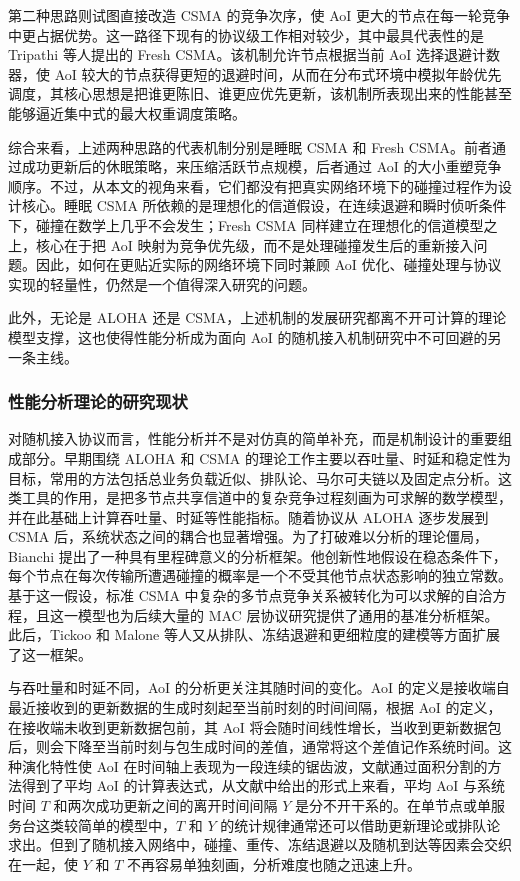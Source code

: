第二种思路则试图直接改造 CSMA 的竞争次序，使 AoI 更大的节点在每一轮竞争中更占据优势。这一路径下现有的协议级工作相对较少，其中最具代表性的是 Tripathi 等人提出的 Fresh CSMA。该机制允许节点根据当前 AoI 选择退避计数器，使 AoI 较大的节点获得更短的退避时间，从而在分布式环境中模拟年龄优先调度，其核心思想是把谁更陈旧、谁更应优先更新，该机制所表现出来的性能甚至能够逼近集中式的最大权重调度策略。

综合来看，上述两种思路的代表机制分别是睡眠 CSMA 和 Fresh CSMA。前者通过成功更新后的休眠策略，来压缩活跃节点规模，后者通过 AoI 的大小重塑竞争顺序。不过，从本文的视角来看，它们都没有把真实网络环境下的碰撞过程作为设计核心。睡眠 CSMA 所依赖的是理想化的信道假设，在连续退避和瞬时侦听条件下，碰撞在数学上几乎不会发生；Fresh CSMA 同样建立在理想化的信道模型之上，核心在于把 AoI 映射为竞争优先级，而不是处理碰撞发生后的重新接入问题。因此，如何在更贴近实际的网络环境下同时兼顾 AoI 优化、碰撞处理与协议实现的轻量性，仍然是一个值得深入研究的问题。

此外，无论是 ALOHA 还是 CSMA，上述机制的发展研究都离不开可计算的理论模型支撑，这也使得性能分析成为面向 AoI 的随机接入机制研究中不可回避的另一条主线。

\subsubsection{性能分析理论的研究现状}

对随机接入协议而言，性能分析并不是对仿真的简单补充，而是机制设计的重要组成部分。早期围绕 ALOHA 和 CSMA 的理论工作主要以吞吐量、时延和稳定性为目标，常用的方法包括总业务负载近似、排队论、马尔可夫链以及固定点分析。这类工具的作用，是把多节点共享信道中的复杂竞争过程刻画为可求解的数学模型，并在此基础上计算吞吐量、时延等性能指标。随着协议从 ALOHA 逐步发展到 CSMA 后，系统状态之间的耦合也显著增强。为了打破难以分析的理论僵局，Bianchi 提出了一种具有里程碑意义的分析框架。他创新性地假设在稳态条件下，每个节点在每次传输所遭遇碰撞的概率是一个不受其他节点状态影响的独立常数。基于这一假设，标准 CSMA 中复杂的多节点竞争关系被转化为可以求解的自洽方程，且这一模型也为后续大量的 MAC 层协议研究提供了通用的基准分析框架。此后，Tickoo 和 Malone 等人又从排队、冻结退避和更细粒度的建模等方面扩展了这一框架。

与吞吐量和时延不同，AoI 的分析更关注其随时间的变化。AoI 的定义是接收端自最近接收到的更新数据的生成时刻起至当前时刻的时间间隔，根据 AoI 的定义，在接收端未收到更新数据包前，其 AoI 将会随时间线性增长，当收到更新数据包后，则会下降至当前时刻与包生成时间的差值，通常将这个差值记作系统时间。这种演化特性使 AoI 在时间轴上表现为一段连续的锯齿波，文献通过面积分割的方法得到了平均 AoI 的计算表达式，从文献中给出的形式上来看，平均 AoI 与系统时间 $T$ 和两次成功更新之间的离开时间间隔 $Y$ 是分不开干系的。在单节点或单服务台这类较简单的模型中，$T$ 和 $Y$ 的统计规律通常还可以借助更新理论或排队论求出。但到了随机接入网络中，碰撞、重传、冻结退避以及随机到达等因素会交织在一起，使 $Y$ 和 $T$ 不再容易单独刻画，分析难度也随之迅速上升。

